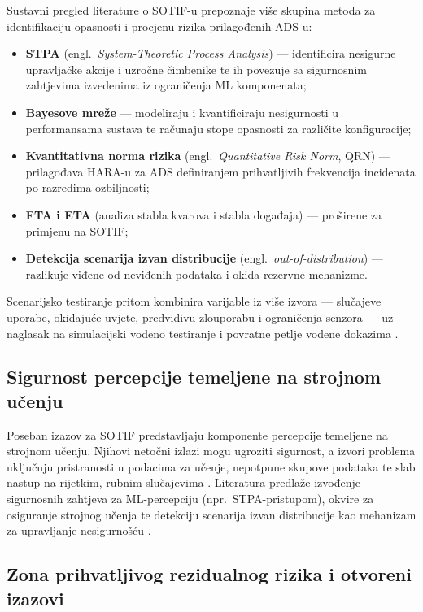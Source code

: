 Sustavni pregled literature o SOTIF-u \cite{patel2025sotifslr} prepoznaje više skupina metoda za identifikaciju opasnosti i procjenu rizika prilagođenih ADS-u:
\begin{itemize}
  \item \textbf{STPA} (engl.\ \textit{System-Theoretic Process Analysis}) — identificira nesigurne upravljačke akcije i uzročne čimbenike te ih povezuje sa sigurnosnim zahtjevima izvedenima iz ograničenja ML komponenata;
  \item \textbf{Bayesove mreže} — modeliraju i kvantificiraju nesigurnosti u performansama sustava te računaju stope opasnosti za različite konfiguracije;
  \item \textbf{Kvantitativna norma rizika} (engl.\ \textit{Quantitative Risk Norm}, QRN) — prilagođava HARA-u za ADS definiranjem prihvatljivih frekvencija incidenata po razredima ozbiljnosti;
  \item \textbf{FTA i ETA} (analiza stabla kvarova i stabla događaja) — proširene za primjenu na SOTIF;
  \item \textbf{Detekcija scenarija izvan distribucije} (engl.\ \textit{out-of-distribution}) — razlikuje viđene od neviđenih podataka i okida rezervne mehanizme.
\end{itemize}
Scenarijsko testiranje pritom kombinira varijable iz više izvora — slučajeve uporabe, okidajuće uvjete, predvidivu zlouporabu i ograničenja senzora — uz naglasak na simulacijski vođeno testiranje i povratne petlje vođene dokazima \cite{patel2025sotifslr}.

\subsection{Sigurnost percepcije temeljene na strojnom učenju}

Poseban izazov za SOTIF predstavljaju komponente percepcije temeljene na strojnom učenju. Njihovi netočni izlazi mogu ugroziti sigurnost, a izvori problema uključuju pristranosti u podacima za učenje, nepotpune skupove podataka te slab nastup na rijetkim, rubnim slučajevima \cite{patel2025sotifslr}. Literatura predlaže izvođenje sigurnosnih zahtjeva za ML-percepciju (npr.\ STPA-pristupom), okvire za osiguranje strojnog učenja te detekciju scenarija izvan distribucije kao mehanizam za upravljanje nesigurnošću \cite{patel2025sotifslr}.

\subsection{Zona prihvatljivog rezidualnog rizika i otvoreni izazovi}

